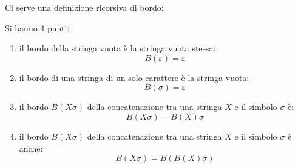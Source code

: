 \documentclass[a4paper,12pt, oneside]{book}
\begin{document}
Ci serve una definizione ricorsiva di bordo:
\begin{definizione}
  Si hanno 4 punti:
  \begin{enumerate}
    \item il bordo della stringa vuota è la stringa vuota stessa:
    \[B(\varepsilon)=\varepsilon\]
    \item il bordo di una stringa di un solo carattere è la stringa vuota:
    \[B(\sigma)=\varepsilon\]
    
    \item il bordo $B(X\sigma)$ della concatenazione tra una stringa $X$ e il
    simbolo $\sigma$ è:
    \[B(X\sigma)=B(X)\sigma\]
    \item il bordo $B(X\sigma)$ della concatenazione tra una stringa $X$ e il
    simbolo $\sigma$ è anche:
    \[B(X\sigma)= B(B(X)\sigma)\]
  \end{enumerate}
\end{definizione}
\end{document}
